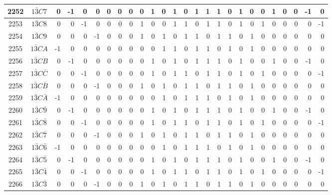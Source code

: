 \documentclass[12 pt]{article}%
\begin{document}
\begin{tiny}
\begin{centering}
\begin{longtable}{|c|c||rrrrrrrrrrrrrrrrrrrrrrrr|}
      \hline
      2252 & $1\bar3C7$ & 0 & -1 & 0 & 0 & 0 & 0 & 0 & 0 & 1 & 0 & 1 & 0 & 1 & 1 & 1 & 0 & 1 & 0 & 0 & 1 & 0 & 0 & -1 & 0 \\
      \hline
      2253 & $1\bar3C8$ & 0 & 0 & -1 & 0 & 0 & 0 & 0 & 1 & 0 & 0 & 1 & 1 & 0 & 1 & 1 & 0 & 1 & 0 & 1 & 0 & 0 & 0 & 0 & -1 \\
      \hline
      2254 & $1\bar3C9$ & 0 & 0 & 0 & -1 & 0 & 0 & 0 & 1 & 0 & 1 & 0 & 1 & 1 & 0 & 1 & 1 & 0 & 1 & 0 & 0 & 0 & 0 & 0 & 0 \\
      \hline
      2255 & $1\bar3CA$ & -1 & 0 & 0 & 0 & 0 & 0 & 0 & 0 & 0 & 1 & 1 & 0 & 1 & 1 & 0 & 1 & 0 & 1 & 0 & 0 & 0 & 0 & 0 & 0 \\
      \hline
      2256 & $1\bar3CB$ & 0 & -1 & 0 & 0 & 0 & 0 & 0 & 0 & 1 & 0 & 1 & 0 & 1 & 1 & 1 & 0 & 1 & 0 & 0 & 1 & 0 & 0 & -1 & 0 \\
      \hline
      2257 & $1\bar3C\bar C$ & 0 & 0 & -1 & 0 & 0 & 0 & 0 & 0 & 1 & 0 & 1 & 1 & 0 & 1 & 1 & 0 & 1 & 0 & 1 & 0 & 0 & 0 & 0 & -1 \\
      \hline
      2258 & $1\bar3C\bar B$ & 0 & 0 & 0 & -1 & 0 & 0 & 0 & 1 & 0 & 1 & 0 & 1 & 1 & 0 & 1 & 1 & 0 & 1 & 0 & 0 & 0 & 0 & 0 & 0 \\
      \hline
      2259 & $1\bar3C\bar A$ & -1 & 0 & 0 & 0 & 0 & 0 & 0 & 0 & 0 & 1 & 0 & 1 & 1 & 1 & 0 & 1 & 0 & 1 & 0 & 0 & 0 & 0 & 0 & 0 \\
      \hline
      2260 & $1\bar3C\bar9$ & 0 & -1 & 0 & 0 & 0 & 0 & 0 & 0 & 1 & 0 & 1 & 0 & 1 & 1 & 1 & 0 & 1 & 0 & 0 & 1 & 0 & 0 & -1 & 0 \\
      \hline
      2261 & $1\bar3C\bar8$ & 0 & 0 & -1 & 0 & 0 & 0 & 0 & 0 & 1 & 0 & 1 & 1 & 0 & 1 & 1 & 0 & 1 & 0 & 1 & 0 & 0 & 0 & 0 & -1 \\
      \hline
      2262 & $1\bar3C\bar7$ & 0 & 0 & 0 & -1 & 0 & 0 & 0 & 1 & 0 & 1 & 0 & 1 & 1 & 0 & 1 & 1 & 0 & 1 & 0 & 0 & 0 & 0 & 0 & 0 \\
      \hline
      2263 & $1\bar3C\bar6$ & -1 & 0 & 0 & 0 & 0 & 0 & 0 & 0 & 0 & 1 & 0 & 1 & 1 & 1 & 0 & 1 & 0 & 1 & 0 & 0 & 0 & 0 & 0 & 0 \\
      \hline
      2264 & $1\bar3C\bar5$ & 0 & -1 & 0 & 0 & 0 & 0 & 0 & 0 & 1 & 0 & 1 & 0 & 1 & 1 & 1 & 0 & 1 & 0 & 0 & 1 & 0 & 0 & -1 & 0 \\
      \hline
      2265 & $1\bar3C\bar4$ & 0 & 0 & -1 & 0 & 0 & 0 & 0 & 0 & 1 & 0 & 1 & 1 & 0 & 1 & 1 & 0 & 1 & 0 & 1 & 0 & 0 & 0 & 0 & -1 \\
      \hline
      2266 & $1\bar3C\bar3$ & 0 & 0 & 0 & -1 & 0 & 0 & 0 & 1 & 0 & 1 & 0 & 1 & 1 & 0 & 1 & 1 & 0 & 1 & 0 & 0 & 0 & 0 & 0 & 0 \\

\end{longtable}
\end{centering}
\end{tiny}
\end{document}
